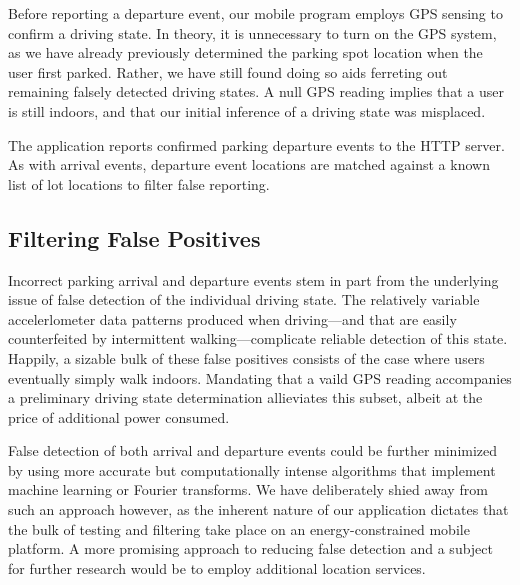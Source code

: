 Before reporting a departure event, our mobile program employs GPS sensing to
confirm a driving state. In theory, it is unnecessary to turn on the GPS
system, as we have already previously determined the parking spot location
when the user first parked. Rather, we have still found doing so aids
ferreting out remaining falsely detected driving states. A null GPS reading
implies that a user is still indoors, and that our initial inference of a
driving state was misplaced.

The application reports confirmed parking departure events to the HTTP
server. As with arrival events, departure event locations are matched against
a known list of lot locations to filter false reporting.

\subsection{Filtering False Positives}

Incorrect parking arrival and departure events stem in part from the
underlying issue of false detection of the individual driving state. The
relatively variable accelerlometer data patterns produced when driving---and
that are easily counterfeited by intermittent walking---complicate reliable
detection of this state. Happily, a sizable bulk of these false positives
consists of the case where users eventually simply walk indoors. Mandating
that a vaild GPS reading accompanies a preliminary driving state
determination allieviates this subset, albeit at the price of additional
power consumed.

False detection of both arrival and departure events could be further
minimized by using more accurate but computationally intense algorithms that
implement machine learning or Fourier transforms. We have deliberately shied
away from such an approach however, as the inherent nature of our application
dictates that the bulk of testing and filtering take place on an
energy-constrained mobile platform. A more promising approach to reducing
false detection and a subject for further research would be to employ
additional location services.
